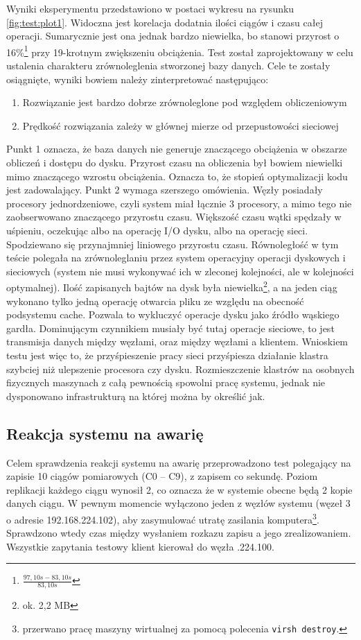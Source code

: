 \documentclass[a4paper,polish,12pt,twoside]{article}
\begin{document}
Wyniki eksperymentu przedstawiono w postaci wykresu na rysunku \ref{fig:test:plot1}. Widoczna jest  korelacja dodatnia ilości ciągów i czasu całej operacji. Sumarycznie jest ona jednak bardzo niewielka, bo stanowi przyrost o 16\%\footnote{$\frac{97,10 s - 83,10 s}{83,10 s}$} przy 19-krotnym zwiększeniu obciążenia. Test został zaprojektowany w celu ustalenia charakteru zrównoleglenia stworzonej bazy danych. Cele te zostały osiągnięte, wyniki bowiem należy zinterpretować następująco:
\begin{enumerate}
	\item Rozwiązanie jest bardzo dobrze zrównoleglone pod względem obliczeniowym
	\item Prędkość rozwiązania zależy w głównej mierze od przepustowości sieciowej
\end{enumerate}
	Punkt 1 oznacza, że baza danych nie generuje znaczącego obciążenia w obszarze obliczeń i dostępu do dysku. Przyrost czasu na obliczenia był bowiem niewielki mimo znaczącego wzrostu obciążenia. Oznacza to, że stopień optymalizacji kodu jest zadowalający. Punkt 2 wymaga szerszego omówienia. Węzły posiadały procesory jednordzeniowe, czyli system miał łącznie 3 procesory, a mimo tego nie zaobserwowano znaczącego przyrostu czasu. Większość czasu wątki spędzały w uśpieniu, oczekując albo na operację I/O dysku, albo na operację sieci. Spodziewano się przynajmniej liniowego przyrostu czasu. Równoległość w tym teście polegała na zrównoleglaniu przez system operacyjny operacji dyskowych i sieciowych (system nie musi wykonywać ich w zleconej kolejności, ale w kolejności optymalnej). Ilość zapisanych bajtów na dysk była niewielka\footnote{ok. 2,2 MB}, a na jeden ciąg wykonano tylko jedną operację otwarcia pliku ze względu na obecność podsystemu cache. Pozwala to wykluczyć operacje dysku jako źródło wąskiego gardła. Dominującym czynnikiem musiały być tutaj operacje sieciowe, to jest transmisja danych między węzłami, oraz między węzłami a klientem. Wnioskiem testu jest więc to, że przyśpieszenie pracy sieci przyśpiesza działanie klastra szybciej niż ulepszenie procesora czy dysku. Rozmieszczenie klastrów na osobnych fizycznych maszynach z całą pewnością spowolni pracę systemu, jednak nie dysponowano infrastrukturą na której można by określić jak.

	\subsection{Reakcja systemu na awarię}
		Celem sprawdzenia reakcji systemu na awarię przeprowadzono test polegający na zapisie 10 ciągów pomiarowych (C0 -- C9), z zapisem co sekundę. Poziom replikacji każdego ciągu wynosił 2, co oznacza że w systemie obecne będą 2 kopie danych ciągu. W pewnym momencie wyłączono jeden z węzłów systemu (węzeł 3 o adresie 192.168.224.102), aby zasymulować utratę zasilania komputera\footnote{przerwano pracę maszyny wirtualnej za pomocą polecenia \texttt{virsh destroy}.}. Sprawdzono wtedy czas między wysłaniem rozkazu zapisu a jego zrealizowaniem. Wszystkie zapytania testowy klient kierował do węzła .224.100.
\end{document}
